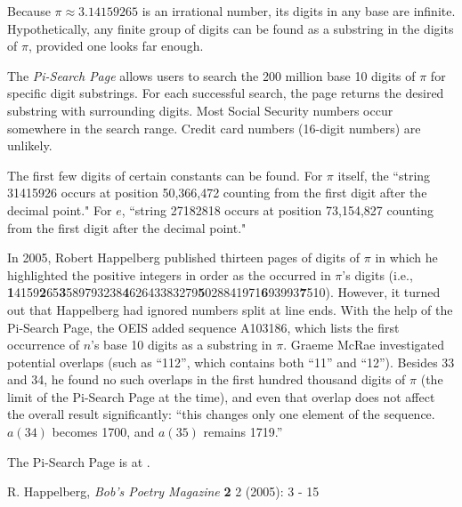 \documentclass[12pt]{article}
\begin{document}
Because $\pi \approx 3.14159265$ is an irrational number, its digits in any base are infinite. Hypothetically, any finite group of digits can be found as a substring in the digits of $\pi$, provided one looks far enough.

The {\em Pi-Search Page} allows users to search the 200 million base 10 digits of $\pi$ for specific digit substrings. For each successful search, the page returns the desired substring with surrounding digits. Most Social Security numbers occur somewhere in the search range. Credit card numbers (16-digit numbers) are unlikely.

The first few digits of certain constants can be found. For $\pi$ itself, the ``string 31415926 occurs at position 50,366,472 counting from the first digit after the decimal point." For $e$, ``string 27182818 occurs at position 73,154,827 counting from the first digit after the decimal point."

In 2005, Robert Happelberg published thirteen pages of digits of $\pi$ in which he highlighted the positive integers in order as the occurred in $\pi$'s digits (i.e., {\bf 1}4159{\bf 2}65{\bf 3}589793238{\bf 4}62643383279{\bf 5}028841971{\bf 6}93993{\bf 7}510). However, it turned out that Happelberg had ignored numbers split at line ends. With the help of the Pi-Search Page, the OEIS added sequence A103186, which lists the first occurrence of $n$'s base 10 digits as a substring in $\pi$. Graeme McRae investigated potential overlaps (such as ``112'', which contains both ``11'' and ``12''). Besides 33 and 34, he found no such overlaps in the first hundred thousand digits of $\pi$ (the limit of the Pi-Search Page at the time), and even that overlap does not affect the overall result significantly: ``this changes only one element of the sequence. $a(34)$ becomes 1700, and $a(35)$ remains 1719.''

The Pi-Search Page is at .

\begin{thebibliography}{1}
 R. Happelberg, {\it Bob's Poetry Magazine} {\bf 2} 2 (2005): 3 - 15
\end{thebibliography}
\end{document}
